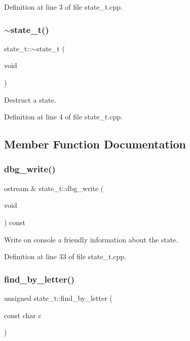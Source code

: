Definition at line 3 of file state\+\_\+t.\+cpp.

\mbox{\label{classstate__t_af27723c21f5cbdbdc237e4bd7aaff2ed}} 
\subsubsection{$\sim$state\+\_\+t()}
{\footnotesize\ttfamily state\+\_\+t\+::$\sim$state\+\_\+t (\begin{DoxyParamCaption}\item[{void}]{ }\end{DoxyParamCaption})}



Destruct a state. 



Definition at line 4 of file state\+\_\+t.\+cpp.



\subsection{Member Function Documentation}
\mbox{\label{classstate__t_a4cbecc58710974534b8f1dc0592b9ae1}} 
\subsubsection{dbg\+\_\+write()}
{\footnotesize\ttfamily ostream \& state\+\_\+t\+::dbg\+\_\+write (\begin{DoxyParamCaption}\item[{void}]{ }\end{DoxyParamCaption}) const}



Write on console a friendly information about the state. 



Definition at line 33 of file state\+\_\+t.\+cpp.

\mbox{\label{classstate__t_a716e1078c9486ebb9686dfc97d5749c7}} 
\subsubsection{find\+\_\+by\+\_\+letter()}
{\footnotesize\ttfamily unsigned state\+\_\+t\+::find\+\_\+by\+\_\+letter (\begin{DoxyParamCaption}\item[{const char}]{c }\end{DoxyParamCaption})}



